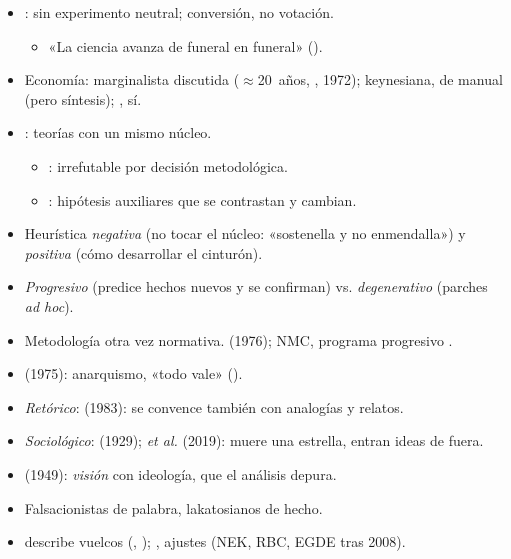 \documentclass{article}
\begin{document}
\begin{columnas}
\begin{itemize}
\item {}: sin experimento neutral; conversión, no votación.
  \begin{itemize}
  \item «La ciencia avanza de funeral en funeral» ().
  \end{itemize}
\item Economía: marginalista discutida ($\approx$20~años, , 1972); keynesiana, de manual (pero síntesis); , sí.
\end{itemize}
\begin{itemize}
\item {}: teorías con un mismo núcleo.
  \begin{itemize}
  \item {}: irrefutable por decisión metodológica.
  \item {}: hipótesis auxiliares que se contrastan y cambian.
  \end{itemize}
\item Heurística \emph{negativa} (no tocar el núcleo: «sostenella y no enmendalla») y \emph{positiva} (cómo desarrollar el cinturón).
\end{itemize}
\begin{itemize}
\item \emph{Progresivo} (predice hechos nuevos y se confirman) vs. \emph{degenerativo} (parches \emph{ad hoc}).
\item Metodología otra vez normativa.  (1976); NMC, programa progresivo .
\end{itemize}
\begin{itemize}
\item {} (1975): anarquismo, «todo vale» ().
\item \emph{Retórico}:  (1983): se convence también con analogías y relatos.
\item \emph{Sociológico}:  (1929);  \emph{et al.} (2019): muere una estrella, entran ideas de fuera.
\item {} (1949): \emph{visión} con ideología, que el análisis depura.
\end{itemize}
\begin{itemize}
\item Falsacionistas de palabra, lakatosianos de hecho.
\item {} describe vuelcos (, ); , ajustes (NEK, RBC, EGDE tras 2008).
\end{itemize}


\end{columnas}
\end{document}
